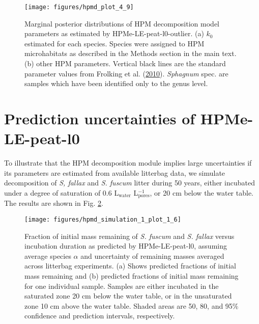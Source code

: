 \documentclass[
  12pt,
]{article}
\begin{document}
\begin{figure}[H]

{\centering \texttt{[image: figures/hpmd\_plot\_4\_9]} 

}

\caption{Marginal posterior distributions of HPM decomposition model parameters as estimated by HPMe-LE-peat-l0-outlier. (a) \(k_0\) estimated for each species. Species were assigned to HPM microhabitats as described in the Methods section in the main text. (b) other HPM parameters. Vertical black lines are the standard parameter values from Frolking et al. (\protect\hyperlink{ref-Frolking.2010}{2010}). \emph{Sphagnum} spec. are samples which have been identified only to the genus level.}\label{fig:sup-hpmd-plot-4-9}
\end{figure}

\hypertarget{sup-11}{%
\section{Prediction uncertainties of HPMe-LE-peat-l0}\label{sup-11}}

To illustrate that the HPM decomposition module implies large uncertainties if its parameters are estimated from available litterbag data, we simulate decomposition of \emph{S, fallax} and \emph{S. fuscum} litter during 50 years, either incubated under a degree of saturation of 0.6 L\(_\text{water}\) L\(_\text{pores}^{-1}\), or 20 cm below the water table. The results are shown in Fig. \ref{fig:sup-hpmd-simulation-1-plot-6}.



\begin{figure}[H]

{\centering \texttt{[image: figures/hpmd\_simulation\_1\_plot\_1\_6]} 

}

\caption{Fraction of initial mass remaining of \emph{S. fuscum} and \emph{S. fallax} versus incubation duration as predicted by HPMe-LE-peat-l0, assuming average species \(\alpha\) and uncertainty of remaining masses averaged across litterbag experiments. (a) Shows predicted fractions of initial mass remaining and (b) predicted fractions of initial mass remaining for one individual sample. Samples are either incubated in the saturated zone 20 cm below the water table, or in the unsaturated zone 10 cm above the water table. Shaded areas are 50, 80, and 95\% confidence and prediction intervals, respectively.}\label{fig:sup-hpmd-simulation-1-plot-6}
\end{figure}
\end{document}
